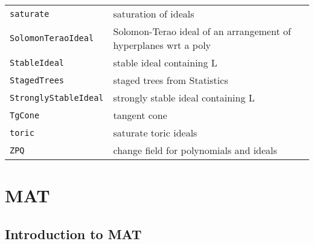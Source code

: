 \documentclass[a4paper]{mybook}
\begin{document}
\begin{center}
\begin{longtable}{ll}
{\verb~saturate~} &
      saturation of ideals\\
   
{\verb~SolomonTeraoIdeal~} &
      Solomon-Terao ideal of an arrangement of hyperplanes wrt a poly\\
   
{\verb~StableIdeal~} &
      stable ideal containing L\\
   
{\verb~StagedTrees~} &
      staged trees from Statistics\\
   
{\verb~StronglyStableIdeal~} &
      strongly stable ideal containing L\\
   
{\verb~TgCone~} &
      tangent cone\\
   
{\verb~toric~} &
      saturate toric ideals\\
   
{\verb~ZPQ~} &
      change field for polynomials and ideals\\
   
\end{longtable}
\end{center}

\noindent



\chapter{MAT}
\label{MAT}

      

\section{Introduction to MAT}
\label{Introduction to MAT}
\end{document}
